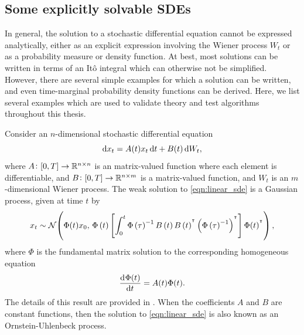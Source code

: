 






\subsection{Some explicitly solvable SDEs}\label{sec:back_sde_solutions}
In general, the solution to a stochastic differential equation cannot be expressed analytically, either as an explicit expression involving the Wiener process \(W_t\) or as a probability measure or density function.
At best, most solutions can be written in terms of an It\^o integral which can otherwise not be simplified.
However, there are several simple examples for which a solution can be written, and even time-marginal probability density functions can be derived.
Here, we list several examples which are used to validate theory and test algorithms throughout this thesis.

\begin{example}
	Consider an \(n\)-dimensional stochastic differential equation
	\begin{equation}
		\sde{x_t}{A(t)x_t}{B(t)},
		\label{eqn:linear_sde}
	\end{equation}
	where \(A\colon [0,T] \to \mathbb{R}^{n\times n}\) is an matrix-valued function where each element is differentiable, and \(B\colon [0,T] \to \mathbb{R}^{n\times m}\) is a matrix-valued function, and \(W_t\) is an \(m\)-dimensional Wiener process.
	The weak solution to \eqref{eqn:linear_sde} is a Gaussian process, given at time \(t\) by
	\[
		x_t \sim\mathcal{N}\!\left(\Phi(t) x_0, \, \Phi\left(t\right)\left[\int_0^t{\Phi\left(\tau\right)^{-1}B\left(t\right)B\left(t\right)^{^{\intercal}}\left(\Phi\left(\tau\right)^{-1}\right)^{^{\intercal}}}\right]\Phi(t)^{^{\intercal}}\right),
	\]
	where \(\Phi\) is the fundamental matrix solution to the corresponding homogeneous equation
	\[
		\dod{\Phi(t)}{t} = A(t)\Phi(t).
	\]
	The details of this result are provided in .
	When the coefficients \(A\) and \(B\) are constant functions, then the solution to \eqref{eqn:linear_sde} is also known as an Ornstein-Uhlenbeck process.

\end{example}

